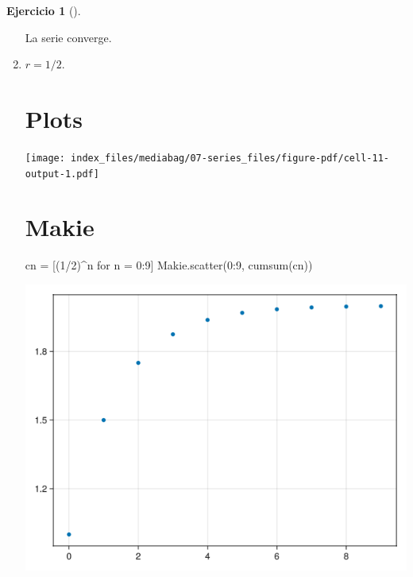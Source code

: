\documentclass[
  a4paper,
]{scrreport}
\newenvironment{Shaded}{\begin{snugshade}}{\end{snugshade}}
\newcommand{\FloatTok}[1]{\textcolor[rgb]{0.68,0.00,0.00}{#1}}
\newcommand{\FunctionTok}[1]{\textcolor[rgb]{0.28,0.35,0.67}{#1}}
\newcommand{\NormalTok}[1]{\textcolor[rgb]{0.00,0.23,0.31}{#1}}
\newcommand{\OperatorTok}[1]{\textcolor[rgb]{0.37,0.37,0.37}{#1}}
\newcommand{\SpecialCharTok}[1]{\textcolor[rgb]{0.37,0.37,0.37}{#1}}
\newcommand{\StringTok}[1]{\textcolor[rgb]{0.13,0.47,0.30}{#1}}
\theoremstyle{definition}
\newtheorem{exercise}{Ejercicio}[chapter]
\theoremstyle{remark}
\begin{document}
\begin{exercise}[]
\begin{tcolorbox}
\begin{enumerate}
  La serie converge.
\item
  \(r=1/2\).

  \section{Plots}

\begin{Shaded}
\end{Shaded}

  \texttt{[image: index\_files/mediabag/07-series\_files/figure-pdf/cell-11-output-1.pdf]}

  \section{Makie}

\begin{Shaded}
\begin{Highlighting}[]
\NormalTok{cn }\OperatorTok{=}\NormalTok{ [(}\FloatTok{1}\OperatorTok{/}\FloatTok{2}\NormalTok{)}\OperatorTok{\^{}}\NormalTok{n for n }\OperatorTok{=} \FloatTok{0}\OperatorTok{:}\FloatTok{9}\NormalTok{]}
\NormalTok{Makie.}\FunctionTok{scatter}\NormalTok{(}\FloatTok{0}\OperatorTok{:}\FloatTok{9}\NormalTok{, }\FunctionTok{cumsum}\NormalTok{(cn))}
\end{Highlighting}
\end{Shaded}

  \includegraphics{07-series_files/figure-pdf/cell-12-output-1.png}


\end{enumerate}
\end{tcolorbox}
\end{exercise}
\end{document}
